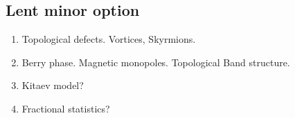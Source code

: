 \subsection{Lent minor option}


\begin{enumerate}

\item Topological defects. Vortices, Skyrmions. 

\item Berry phase. Magnetic monopoles. Topological Band structure.

\item Kitaev model?

\item Fractional statistics?
\end{enumerate}